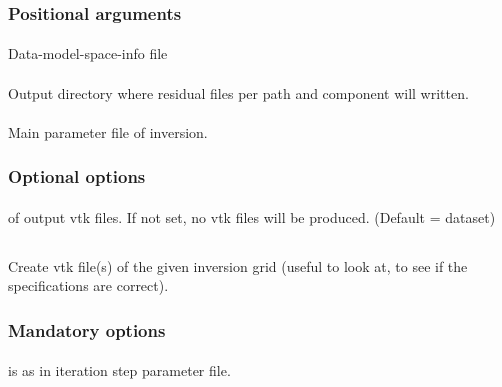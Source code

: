 \subsubsection{Positional arguments}
\paragraph{}
Data-model-space-info file
\paragraph{}
Output directory where residual files per path and component will written.
\paragraph{}
Main parameter file of inversion.
\subsubsection{Optional options}
\paragraph{}
 of output vtk files. If not set, no vtk files will be produced. (Default = dataset)
%
%
\subsection{} \label{programs_scripts,sec:bin_prog,sec:invgrid_vtk}
Create vtk file(s) of the given inversion grid (useful to look at, to see if the specifications are correct).

\subsubsection{Mandatory options}
\paragraph{}
 is  as in \ASKI{} iteration step parameter file.

